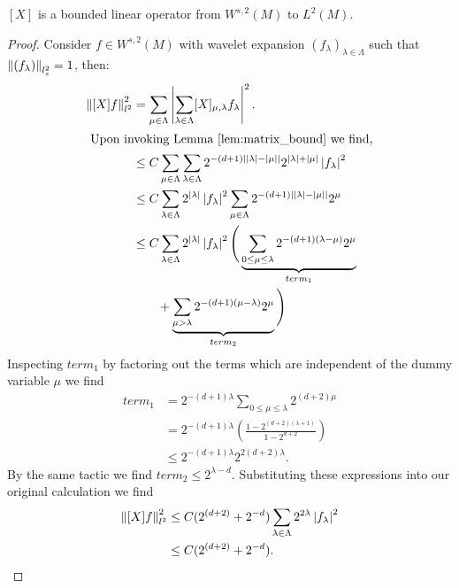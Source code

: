 \begin{lemma} \label{lem:M_bound}
	$[X]$ is a bounded linear operator from $W^{s,2}(M)$ to $L^2(M)$.
\end{lemma}
\begin{proof}
	Consider $f \in W^{s,2}(M)$ with wavelet expansion $(f_\lambda)_{\lambda \in \Lambda}$ such that $\left\| (f_\lambda) \right\|_{l_s^2} = 1$, then:
	\begin{align*}
		\left\| [X] f \right\|_{l^2}^2   &=    \sum_{\mu \in \Lambda} \left|  \sum_{\lambda \in \Lambda} [X]_{\mu,\lambda} f_{\lambda}  \right|^2. \\
		\intertext{ Upon invoking Lemma \ref{lem:matrix_bound} we find,}
							&\leq C\sum_{\mu \in \Lambda} \sum_{\lambda \in \Lambda} 2^{-(d+1)\left| {\lvert\lambda\rvert} - {\lvert\mu\rvert} \right|} 2^{{\lvert\lambda\rvert}+{\lvert\mu\rvert}} \left| f_\lambda \right|^2 \\
							&\leq C\sum_{\lambda \in \Lambda} 2^{{\lvert\lambda\rvert}} \left| f_\lambda \right|^2 \sum_{\mu \in \Lambda} 2^{-(d+1)\left| {\lvert\lambda\rvert}-{\lvert\mu\rvert} \right|}2^\mu \\
							&\leq C\sum_{\lambda \in \Lambda}  2^{{\lvert\lambda\rvert}} \left| f_\lambda \right|^2 \Bigg( \underbrace{\sum_{0\leq\mu\leq\lambda} 2^{-(d+1)(\lambda - \mu)}2^{\mu}}_{term_1} \\
							&\qquad  + \underbrace{\sum_{\mu > \lambda} 2^{-(d+1)(\mu-\lambda)}2^{\mu} }_{term_2} \Bigg) \label{eq:terms}
		\end{align*}
		Inspecting $term_1$ by factoring out the terms which are independent of the dummy variable $\mu$ we find
		\begin{align*}
			term_1 &= 2^{-(d+1) \lambda }\sum_{0\leq\mu\leq\lambda} 2^{(d+2) \mu} \\
			&= 2^{-(d+1) \lambda} \left(  \frac{ 1-2^{(d+2)(\lambda + 1)} }{1 - 2^{d+2} } \right) \\
			&\leq 2^{-(d+1) \lambda} 2^{2(d+2)\lambda}.
		\end{align*}
		By the same tactic we find $term_2 \leq 2^{\lambda - d}$.  Substituting these expressions into our original calculation we find
		\begin{align*}	
			\left\| [X]f \right\|_{l^2}^2 	&\leq C(2^{(d+2)}+2^{-d}) \sum_{\lambda \in \Lambda} 2^{2\lambda} \left| f_{\lambda} \right|^2 \\
							&\leq C(2^{(d+2)}+2^{-d}).
		\end{align*}
\end{proof}


